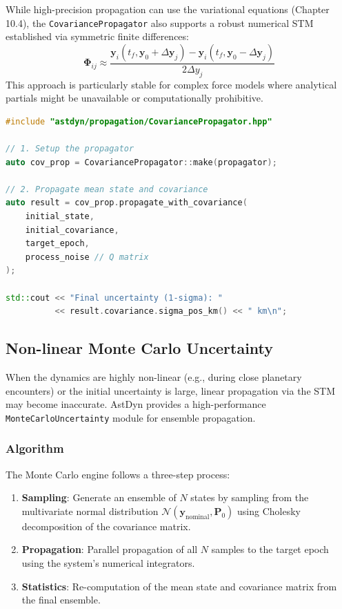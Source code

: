 While high-precision propagation can use the variational equations (Chapter 10.4), the \texttt{CovariancePropagator} also supports a robust numerical STM established via symmetric finite differences:
\begin{equation}
    \mathbf{\Phi}_{ij} \approx \frac{\mathbf{y}_i(t_f, \mathbf{y}_0 + \Delta\mathbf{y}_j) - \mathbf{y}_i(t_f, \mathbf{y}_0 - \Delta\mathbf{y}_j)}{2 \Delta y_j}
\end{equation}
This approach is particularly stable for complex force models where analytical partials might be unavailable or computationally prohibitive.

\begin{lstlisting}[language=C++,caption={Linear Covariance Propagation Example}]
#include "astdyn/propagation/CovariancePropagator.hpp"

// 1. Setup the propagator
auto cov_prop = CovariancePropagator::make(propagator);

// 2. Propagate mean state and covariance
auto result = cov_prop.propagate_with_covariance(
    initial_state,
    initial_covariance,
    target_epoch,
    process_noise // Q matrix
);

std::cout << "Final uncertainty (1-sigma): " 
          << result.covariance.sigma_pos_km() << " km\n";
\end{lstlisting}

\subsection{Non-linear Monte Carlo Uncertainty}

When the dynamics are highly non-linear (e.g., during close planetary encounters) or the initial uncertainty is large, linear propagation via the STM may become inaccurate. AstDyn provides a high-performance \texttt{MonteCarloUncertainty} module for ensemble propagation.

\subsubsection{Algorithm}

The Monte Carlo engine follows a three-step process:
\begin{enumerate}
    \item \textbf{Sampling}: Generate an ensemble of $N$ states by sampling from the multivariate normal distribution $\mathcal{N}(\mathbf{y}_{\text{nominal}}, \mathbf{P}_0)$ using Cholesky decomposition of the covariance matrix.
    \item \textbf{Propagation}: Parallel propagation of all $N$ samples to the target epoch using the system's numerical integrators.
    \item \textbf{Statistics}: Re-computation of the mean state and covariance matrix from the final ensemble.
\end{enumerate}

